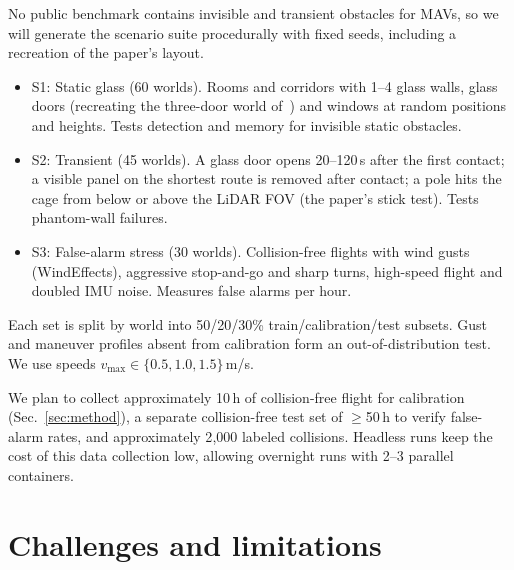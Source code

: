 \documentclass[conference,10pt]{IEEEtran}
\begin{document}
No public benchmark contains invisible and transient obstacles for MAVs, so we will generate the scenario suite procedurally with fixed seeds, including a recreation of the paper's layout.
\begin{itemize}
\item S1: Static glass (60 worlds). Rooms and corridors with 1--4 glass walls, glass doors (recreating the three-door world of~\cite{airbumper}) and windows at random positions and heights. Tests detection and memory for invisible static obstacles.
\item S2: Transient (45 worlds). A glass door opens 20--120\,s after the first contact; a visible panel on the shortest route is removed after contact; a pole hits the cage from below or above the LiDAR FOV (the paper's stick test). Tests phantom-wall failures.
\item S3: False-alarm stress (30 worlds). Collision-free flights with wind gusts (WindEffects), aggressive stop-and-go and sharp turns, high-speed flight and doubled IMU noise. Measures false alarms per hour.
\end{itemize}
Each set is split by world into 50/20/30\% train/calibration/test subsets. Gust and maneuver profiles absent from calibration form an out-of-distribution test. We use speeds $v_{\max}\in\{0.5,1.0,1.5\}$\,m/s.

We plan to collect approximately 10\,h of collision-free flight for calibration (Sec.~\ref{sec:method}), a separate collision-free test set of $\ge$50\,h to verify false-alarm rates, and approximately 2{,}000 labeled collisions. Headless runs keep the cost of this data collection low, allowing overnight runs with 2--3 parallel containers.

\section{Challenges and limitations}
\end{document}
